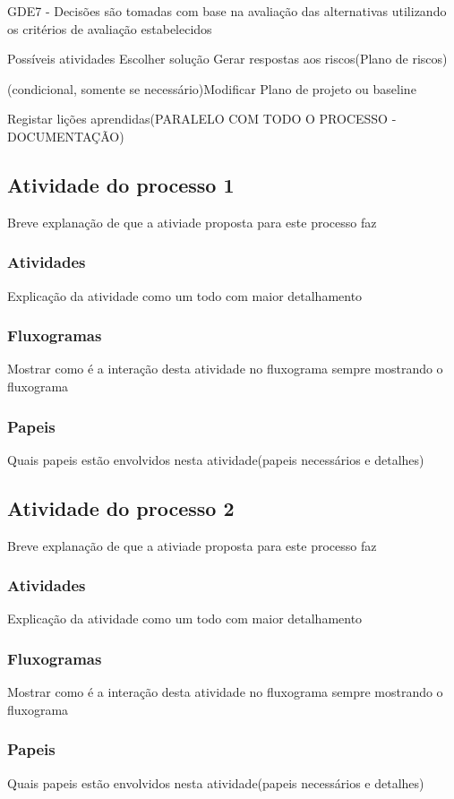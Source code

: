 \documentclass{article}
\begin{document}
	GDE7 - Decisões são tomadas com base na avaliação das alternativas utilizando os critérios de avaliação estabelecidos
	
		
		Possíveis atividades
			Escolher solução
				Gerar respostas 	aos riscos(Plano de riscos)
			
			(condicional, somente se necessário)Modificar Plano de projeto ou baseline			
			
			Registar lições aprendidas(PARALELO COM TODO O PROCESSO - DOCUMENTAÇÃO)	
	
	\subsection{Atividade do processo 1}
		Breve explanação de que a ativiade proposta para este processo faz
		
		\subsubsection{Atividades}
			Explicação da atividade como um todo com maior detalhamento
		\subsubsection{Fluxogramas}
			Mostrar como é a interação desta atividade no fluxograma sempre mostrando o fluxograma
		\subsubsection{Papeis}
			Quais papeis estão envolvidos nesta atividade(papeis necessários e detalhes)

	\subsection{Atividade do processo 2}
		Breve explanação de que a ativiade proposta para este processo faz
		
		\subsubsection{Atividades}
			Explicação da atividade como um todo com maior detalhamento
		\subsubsection{Fluxogramas}
			Mostrar como é a interação desta atividade no fluxograma sempre mostrando o fluxograma
		\subsubsection{Papeis}
			Quais papeis estão envolvidos nesta atividade(papeis necessários e detalhes)
\end{document}
